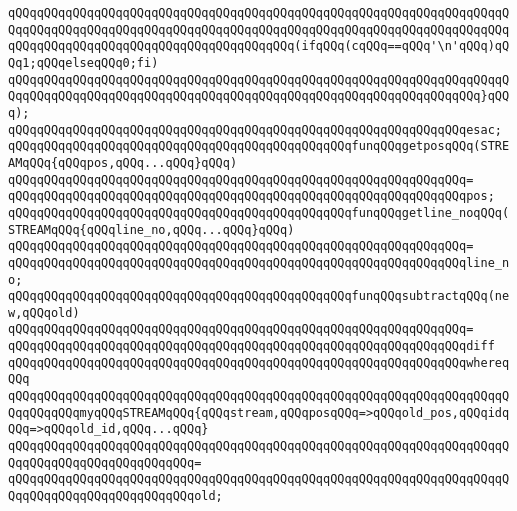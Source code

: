 \verb|qQQqqQQqqQQqqQQqqQQqqQQqqQQqqQQqqQQqqQQqqQQqqQQqqQQqqQQqqQQqqQQqqQQqqQQqqQQqqQQqqQQqqQQqqQQqqQQqqQQqqQQqqQQqqQQqqQQqqQQqqQQqqQQqqQQqqQQqqQQqqQQqqQQqqQQqqQQqqQQqqQQqqQQqqQQqqQQqqQQq(ifqQQq(cqQQq==qQQq'\n'qQQq)qQQq1;qQQqelseqQQq0;fi)|\newline
\verb|qQQqqQQqqQQqqQQqqQQqqQQqqQQqqQQqqQQqqQQqqQQqqQQqqQQqqQQqqQQqqQQqqQQqqQQqqQQqqQQqqQQqqQQqqQQqqQQqqQQqqQQqqQQqqQQqqQQqqQQqqQQqqQQqqQQqqQQq}qQQq);|\newline
\verb|qQQqqQQqqQQqqQQqqQQqqQQqqQQqqQQqqQQqqQQqqQQqqQQqqQQqqQQqqQQqqQQqesac;|\newline
\newline
\verb|qQQqqQQqqQQqqQQqqQQqqQQqqQQqqQQqqQQqqQQqqQQqqQQqfunqQQqgetposqQQq(STREAMqQQq{qQQqpos,qQQq...qQQq}qQQq)|\newline
\verb|qQQqqQQqqQQqqQQqqQQqqQQqqQQqqQQqqQQqqQQqqQQqqQQqqQQqqQQqqQQqqQQq=|\newline
\verb|qQQqqQQqqQQqqQQqqQQqqQQqqQQqqQQqqQQqqQQqqQQqqQQqqQQqqQQqqQQqqQQqpos;|\newline
\newline
\verb|qQQqqQQqqQQqqQQqqQQqqQQqqQQqqQQqqQQqqQQqqQQqqQQqfunqQQqgetline_noqQQq(STREAMqQQq{qQQqline_no,qQQq...qQQq}qQQq)|\newline
\verb|qQQqqQQqqQQqqQQqqQQqqQQqqQQqqQQqqQQqqQQqqQQqqQQqqQQqqQQqqQQqqQQq=|\newline
\verb|qQQqqQQqqQQqqQQqqQQqqQQqqQQqqQQqqQQqqQQqqQQqqQQqqQQqqQQqqQQqqQQqline_no;|\newline
\newline
\verb|qQQqqQQqqQQqqQQqqQQqqQQqqQQqqQQqqQQqqQQqqQQqqQQqfunqQQqsubtractqQQq(new,qQQqold)|\newline
\verb|qQQqqQQqqQQqqQQqqQQqqQQqqQQqqQQqqQQqqQQqqQQqqQQqqQQqqQQqqQQqqQQq=|\newline
\verb|qQQqqQQqqQQqqQQqqQQqqQQqqQQqqQQqqQQqqQQqqQQqqQQqqQQqqQQqqQQqqQQqdiff|\newline
\verb|qQQqqQQqqQQqqQQqqQQqqQQqqQQqqQQqqQQqqQQqqQQqqQQqqQQqqQQqqQQqqQQqwhereqQQq|\newline
\newline
\verb|qQQqqQQqqQQqqQQqqQQqqQQqqQQqqQQqqQQqqQQqqQQqqQQqqQQqqQQqqQQqqQQqqQQqqQQqqQQqqQQqmyqQQqSTREAMqQQq{qQQqstream,qQQqposqQQq=>qQQqold_pos,qQQqidqQQq=>qQQqold_id,qQQq...qQQq}|\newline
\verb|qQQqqQQqqQQqqQQqqQQqqQQqqQQqqQQqqQQqqQQqqQQqqQQqqQQqqQQqqQQqqQQqqQQqqQQqqQQqqQQqqQQqqQQqqQQqqQQq=|\newline
\verb|qQQqqQQqqQQqqQQqqQQqqQQqqQQqqQQqqQQqqQQqqQQqqQQqqQQqqQQqqQQqqQQqqQQqqQQqqQQqqQQqqQQqqQQqqQQqqQQqold;|\newline
